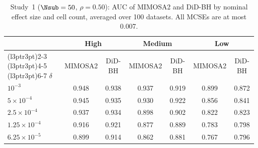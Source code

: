 \begin{table}[!h]
\centering
\caption{Study~1 ($\Nsub = 50$, $\rho = 0.50$): AUC of MIMOSA2 and DiD-BH by nominal effect size and cell count, averaged over 100 datasets. All MCSEs are at most 0.007.\label{tbl_baseline_summary_P50_auc}}
\centering
\begin{tabular}[t]{lcccccc}
\toprule
\multicolumn{1}{c}{ } & \multicolumn{2}{c}{High} & \multicolumn{2}{c}{Medium} & \multicolumn{2}{c}{Low} \\
\cmidrule(l{3pt}r{3pt}){2-3} \cmidrule(l{3pt}r{3pt}){4-5} \cmidrule(l{3pt}r{3pt}){6-7}
$\delta$ & MIMOSA2 & DiD-BH & MIMOSA2 & DiD-BH & MIMOSA2 & DiD-BH\\
\midrule
$10^{-3}$ & 0.948 & 0.938 & 0.937 & 0.919 & 0.899 & 0.872\\
$5\times10^{-4}$ & 0.945 & 0.935 & 0.930 & 0.922 & 0.856 & 0.841\\
$2.5\times10^{-4}$ & 0.937 & 0.934 & 0.898 & 0.902 & 0.822 & 0.823\\
$1.25\times10^{-4}$ & 0.916 & 0.921 & 0.877 & 0.889 & 0.783 & 0.798\\
$6.25\times10^{-5}$ & 0.899 & 0.914 & 0.862 & 0.881 & 0.767 & 0.796\\
\bottomrule
\end{tabular}
\end{table}
